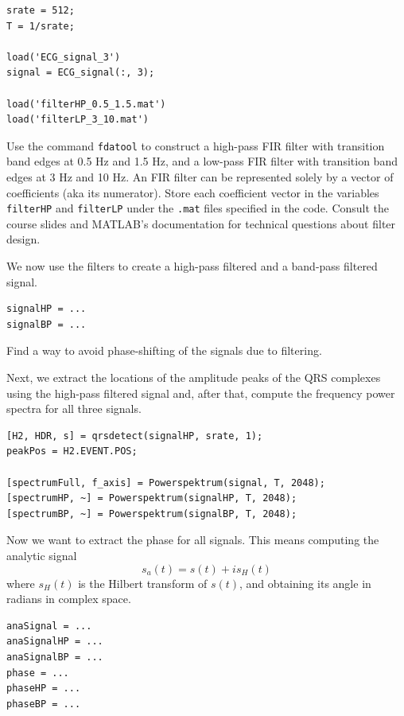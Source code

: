 \documentclass[10pt,a4paper,notitlepage]{report}
\begin{document}
\begin{verbatim}
srate = 512;
T = 1/srate;

load('ECG_signal_3')
signal = ECG_signal(:, 3);

load('filterHP_0.5_1.5.mat')
load('filterLP_3_10.mat')
\end{verbatim}

Use the command \texttt{fdatool} to construct a high-pass FIR filter with transition band edges at 0.5 Hz and 1.5 Hz, and a low-pass FIR filter with transition band edges at 3 Hz and 10 Hz. An FIR filter can be represented solely by a vector of coefficients (aka its numerator). Store each coefficient vector in the variables \texttt{filterHP} and \texttt{filterLP} under the \texttt{.mat} files specified in the code. Consult the course slides and MATLAB's documentation for technical questions about filter design.

We now use the filters to create a high-pass filtered and a band-pass filtered signal.

\begin{verbatim}
signalHP = ...
signalBP = ...
\end{verbatim}

Find a way to avoid phase-shifting of the signals due to filtering.

Next, we extract the locations of the amplitude peaks of the QRS complexes using the high-pass filtered signal and, after that, compute the frequency power spectra for all three signals.

\begin{verbatim}
[H2, HDR, s] = qrsdetect(signalHP, srate, 1);
peakPos = H2.EVENT.POS;

[spectrumFull, f_axis] = Powerspektrum(signal, T, 2048);
[spectrumHP, ~] = Powerspektrum(signalHP, T, 2048);
[spectrumBP, ~] = Powerspektrum(signalBP, T, 2048);
\end{verbatim}

Now we want to extract the phase for all signals. This means computing the analytic signal
\begin{equation*}
s_a(t)=s(t)+is_H(t)
\end{equation*}
where $s_H(t)$ is the Hilbert transform of $s(t)$, and obtaining its angle in radians in complex space.

\begin{verbatim}
anaSignal = ...
anaSignalHP = ...
anaSignalBP = ...
phase = ...
phaseHP = ...
phaseBP = ...
\end{verbatim}
\end{document}
